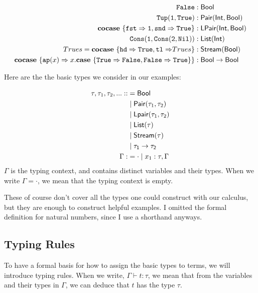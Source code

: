 \documentclass[twoside,12pt,a4paper]{article}
\begin{document}
\begin{example}
    \begin{align*}
        \mathtt{False}&: \mathsf{Bool}\\
        \mathtt{Tup(1,True)}&: \mathsf{Pair(Int, Bool)}\\
        \textbf{cocase}\ \{\mathtt{fst \Rightarrow 1, snd\Rightarrow True}\}&: \mathsf{LPair(Int, Bool)}\\
        \mathtt{Cons(1, Cons(2, Nil))}&: \mathsf{List(Int)}\\
        Trues = \textbf{cocase}\ \{\mathtt{hd \Rightarrow True, tl \Rightarrow} Trues\}&: \mathsf{Stream(Bool)}\\
        \textbf{cocase}\ \{\texttt{ap}(x)\Rightarrow x.\textbf{case}\ \{\mathtt{True\Rightarrow False, False \Rightarrow True}\}\}&: \mathsf{Bool \rightarrow Bool}
    \end{align*}    
\end{example}
Here are the the basic types we consider in our examples:
\begin{definition}
    \begin{align*}
        \tau, \tau_1, \tau_2, ... ::&= \mathsf{Bool} \\
        &\;|\; \mathsf{Pair(}\tau_1, \tau_2\mathsf{)}\\
        &\;|\; \mathsf{Lpair(}\tau_1, \tau_2\mathsf{)}\\
        &\;|\; \mathsf{List(}\tau\mathsf{)}\\
        &\;|\; \mathsf{Stream(}\tau\mathsf{)}\\
        &\;|\; \mathsf{\tau_1 \rightarrow \tau_2}\\
        \Gamma :&= \cdot \;|\; x_1:\tau, \Gamma
    \end{align*}
    $\Gamma$ is the typing context, and contains distinct variables and their types.
    When we write $\Gamma = \cdot$, we mean that the typing context is empty.
\end{definition}
These of course don't cover all the types one could construct with our calculus, but they are enough to construct helpful examples.
I omitted the formal definition for natural numbers, since I use a shorthand anyways.

\subsection{Typing Rules}
To have a formal basis for how to assign the basic types to terms, we will introduce typing rules. 
When we write, $\Gamma\vdash t:\tau$, we mean that from the variables and their types in $\Gamma$, 
we can deduce that $t$ has the type $\tau$.
\end{document}
